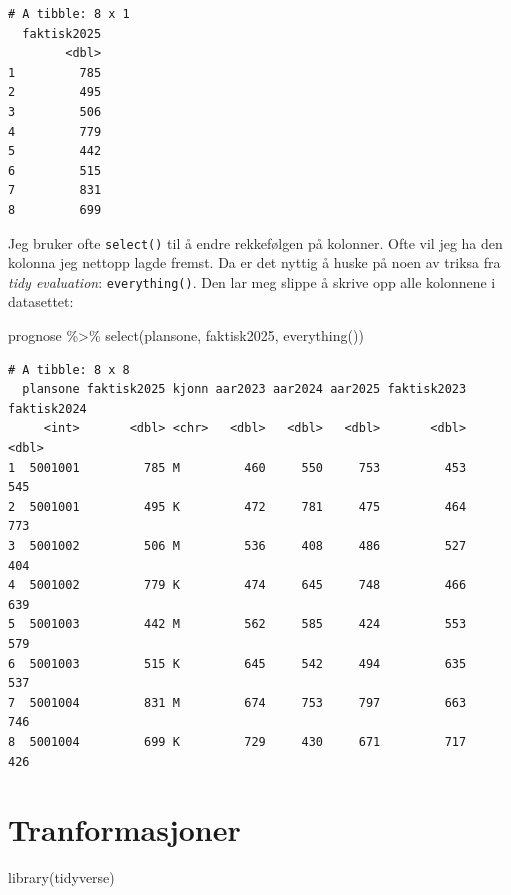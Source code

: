 \documentclass[
  letterpaper,
  DIV=11,
  numbers=noendperiod]{scrreprt}
\newenvironment{Shaded}{\begin{snugshade}}{\end{snugshade}}
\newcommand{\FunctionTok}[1]{\textcolor[rgb]{0.28,0.35,0.67}{#1}}
\newcommand{\NormalTok}[1]{\textcolor[rgb]{0.00,0.23,0.31}{#1}}
\newcommand{\SpecialCharTok}[1]{\textcolor[rgb]{0.37,0.37,0.37}{#1}}
\begin{document}
\begin{verbatim}
# A tibble: 8 x 1
  faktisk2025
        <dbl>
1         785
2         495
3         506
4         779
5         442
6         515
7         831
8         699
\end{verbatim}

Jeg bruker ofte \texttt{select()} til å endre rekkefølgen på kolonner.
Ofte vil jeg ha den kolonna jeg nettopp lagde fremst. Da er det nyttig å
huske på noen av triksa fra \emph{tidy evaluation}:
\texttt{everything()}. Den lar meg slippe å skrive opp alle kolonnene i
datasettet:

\begin{Shaded}
\begin{Highlighting}[]
\NormalTok{prognose }\SpecialCharTok{\%\textgreater{}\%} 
  \FunctionTok{select}\NormalTok{(plansone, faktisk2025, }\FunctionTok{everything}\NormalTok{())}
\end{Highlighting}
\end{Shaded}

\begin{verbatim}
# A tibble: 8 x 8
  plansone faktisk2025 kjonn aar2023 aar2024 aar2025 faktisk2023 faktisk2024
     <int>       <dbl> <chr>   <dbl>   <dbl>   <dbl>       <dbl>       <dbl>
1  5001001         785 M         460     550     753         453         545
2  5001001         495 K         472     781     475         464         773
3  5001002         506 M         536     408     486         527         404
4  5001002         779 K         474     645     748         466         639
5  5001003         442 M         562     585     424         553         579
6  5001003         515 K         645     542     494         635         537
7  5001004         831 M         674     753     797         663         746
8  5001004         699 K         729     430     671         717         426
\end{verbatim}


\hypertarget{tranformasjoner}{%
\chapter{Tranformasjoner}\label{tranformasjoner}}

\begin{Shaded}
\begin{Highlighting}[]
\FunctionTok{library}\NormalTok{(tidyverse)}
\end{Highlighting}
\end{Shaded}
\end{document}

